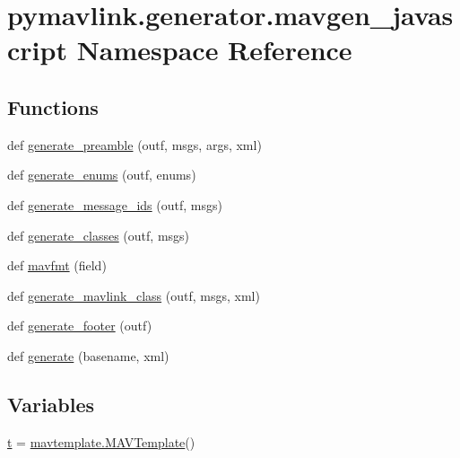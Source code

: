 \hypertarget{namespacepymavlink_1_1generator_1_1mavgen__javascript}{}\section{pymavlink.\+generator.\+mavgen\+\_\+javascript Namespace Reference}
\label{namespacepymavlink_1_1generator_1_1mavgen__javascript}
\subsection*{Functions}
\begin{DoxyCompactItemize}
\item 
def \mbox{\hyperlink{namespacepymavlink_1_1generator_1_1mavgen__javascript_ad1cc83701bb043630ad79b970137e84c}{generate\+\_\+preamble}} (outf, msgs, args, xml)
\item 
def \mbox{\hyperlink{namespacepymavlink_1_1generator_1_1mavgen__javascript_aee21c87a4dc8fd18e142518307140e54}{generate\+\_\+enums}} (outf, enums)
\item 
def \mbox{\hyperlink{namespacepymavlink_1_1generator_1_1mavgen__javascript_a4b37442e2192201d57be9181ec5743dc}{generate\+\_\+message\+\_\+ids}} (outf, msgs)
\item 
def \mbox{\hyperlink{namespacepymavlink_1_1generator_1_1mavgen__javascript_aa0aa15fc819656c01cf8decc8f7ace6a}{generate\+\_\+classes}} (outf, msgs)
\item 
def \mbox{\hyperlink{namespacepymavlink_1_1generator_1_1mavgen__javascript_a5193d9a9ee0c09b4d88d2b34381d81fe}{mavfmt}} (field)
\item 
def \mbox{\hyperlink{namespacepymavlink_1_1generator_1_1mavgen__javascript_adca854dd288385d5e7da8b833425388e}{generate\+\_\+mavlink\+\_\+class}} (outf, msgs, xml)
\item 
def \mbox{\hyperlink{namespacepymavlink_1_1generator_1_1mavgen__javascript_a983f5d7b44460d0aa4467462f01a31cb}{generate\+\_\+footer}} (outf)
\item 
def \mbox{\hyperlink{namespacepymavlink_1_1generator_1_1mavgen__javascript_a91d9cd83428167ae922bb2bf9c97f811}{generate}} (basename, xml)
\end{DoxyCompactItemize}
\subsection*{Variables}
\begin{DoxyCompactItemize}
\item 
\mbox{\hyperlink{namespacepymavlink_1_1generator_1_1mavgen__javascript_ad711c52bdae50feb5c8562d1dd3d8ba7}{t}} = \mbox{\hyperlink{classpymavlink_1_1generator_1_1mavtemplate_1_1MAVTemplate}{mavtemplate.\+M\+A\+V\+Template}}()
\end{DoxyCompactItemize}


